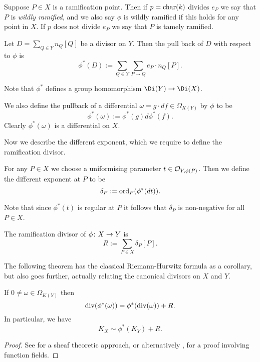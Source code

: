     
Suppose $P \in X$ is a ramification point.
Then if $p = \operatorname{char}(k)$ divides $e_P$ we say that $P$ is \emph{wildly ramified}, and we also say $\phi$ is wildly ramified if this holds for any point in $X$.
If $p$ does not divide $e_P$ we say that $P$ is tamely ramified.

    \begin{defn}
    Let $D = \sum_{Q \in Y}n_Q [Q]$ be a divisor on $Y$.
    Then the pull back of $D$ with respect to $\phi$ is
        \[
        \phi^*(D) := \sum_{Q \in Y} \sum_{P \mapsto Q} e_P \cdot n_Q [P].
        \]
    \end{defn}

Note that $\phi^*$ defines a group homomorphism $\Di(Y) \ra \Di(X)$.


We also define the pullback of a differential $\omega = g\cdot df \in \Omega_{K(Y)}$ by $\phi$ to be
    \[
    \phi^*(\omega) := \phi^*(g)d\phi^*(f).
    \]
Clearly $\phi^*(\omega)$ is a differential on $X$.


Now we describe the different exponent, which we require to define the ramification divisor.
    \begin{defn}\label{definitiondifferent}
    For any $P\in X$ we choose a uniformising parameter $t \in {\cal O}_{Y,\phi(P)}$.
    Then we define the different exponent at $P$ to be 
        \[
        \delta_P : = \operatorname{ord}_P(\phi^*(dt)).
        \]
    \end{defn}

Note that since $\phi^*(t)$ is regular at $P$ it follows that $\delta_P$ is non-negative for all $P \in X$.
 
    \begin{defn}\label{defnramificationdivisor}
    The ramification divisor of $\phi \colon X \rightarrow Y$ is 
        \[
        R:= \sum_{P \in X} \delta_P [P].
        \]
    \end{defn}

The following theorem has the classical Riemann-Hurwitz formula as a corollary, but also goes further, actually relating the canonical divisors on $X$ and $Y$.
    \begin{thm}\label{theoremdetailedhurwitz}
    If $0 \neq \omega \in \Omega_{K(Y)}$ then
        \begin{equation}\label{equationstronghurwitzformula}
        \operatorname{div}(\phi^*(\omega)) = \phi^*(\operatorname{div}(\omega)) + R.
        \end{equation}
    In particular, we have
        \[
        K_X \sim \phi^*(K_Y) + R.
        \]
    \end{thm}
    \begin{proof}
    See \cite[Chap.\ IV, \S 2, Prop.\ 2.3]{hart} for a sheaf theoretic approach, or alternatively \cite[Thm. 3.4.6]{stichtenoth}, for a proof involving function fields.
    \end{proof}


